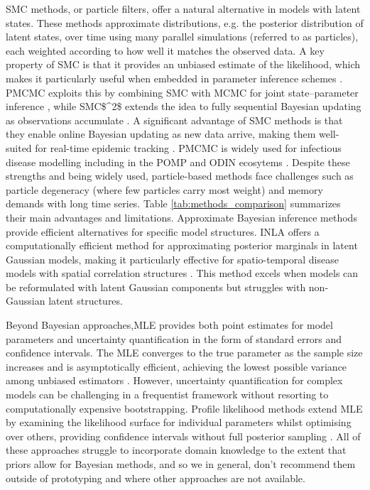 \documentclass{article}
\begin{document}
\ac{SMC} methods, or particle filters, offer a natural alternative in models with latent states. These methods approximate distributions, e.g. the posterior distribution of latent states, over time using many parallel simulations (referred to as particles), each weighted according to how well it matches the observed data. A key property of SMC is that it provides an unbiased estimate of the likelihood, which makes it particularly useful when embedded in parameter inference schemes \citep{doucet2001introduction}. \ac{PMCMC} exploits this by combining SMC with MCMC for joint state–parameter inference \citep{andrieu2010particle, endo2019introduction}, while \ac{SMC$^2$} extends the idea to fully sequential Bayesian updating as observations accumulate \citep{chopin2013smc2, TEMFACK2025100847}. A significant advantage of  \ac{SMC} methods is that they enable online Bayesian updating as new data arrive, making them well-suited for real-time epidemic tracking \citep{birrell2020efficient, storvik2023sequential}. 
\ac{PMCMC} is widely used for infectious disease modelling including in the \ac{POMP} and ODIN ecosytems \citep{king2016statistical, fitzjohn2021reproducible}. Despite these strengths and being widely used, particle-based methods face challenges such as particle degeneracy (where few particles carry most weight) and memory demands with long time series. Table \ref{tab:methods_comparison} summarizes their main advantages and limitations.
Approximate Bayesian inference methods provide efficient alternatives for specific model structures.
\ac{INLA} offers a computationally efficient method for approximating posterior marginals in latent Gaussian models, making it particularly effective for spatio-temporal disease models with spatial correlation structures \citep{rue2017bayesian}.
This method excels when models can be reformulated with latent Gaussian components but struggles with non-Gaussian latent structures.

Beyond Bayesian approaches,\ac{MLE} provides both point estimates for model parameters and uncertainty quantification in the form of standard errors and confidence intervals. The MLE converges to the true parameter as the sample size increases and is asymptotically efficient, achieving the lowest possible variance among unbiased estimators \citep{myung2003tutorial, baltazar2024maximum}. However, uncertainty quantification for complex models can be challenging in a frequentist framework without resorting to computationally expensive bootstrapping.
Profile likelihood methods extend \ac{MLE} by examining the likelihood surface for individual parameters whilst optimising over others, providing confidence intervals without full posterior sampling \citep{tonsing2018profile, plank2024structured}.
All of these approaches struggle to incorporate domain knowledge to the extent that priors allow for Bayesian methods, and so we in general, don't recommend them outside of prototyping and where other approaches are not available.
\end{document}

